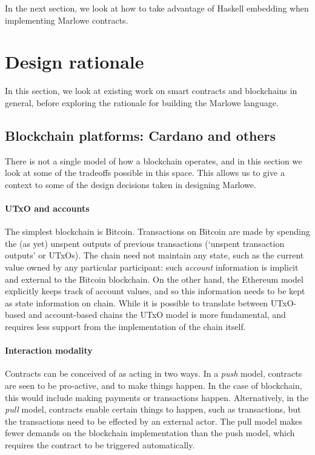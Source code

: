 \documentclass[runningheads]{llncs}
\begin{document}
{In the next section, we look at how to take advantage of Haskell embedding when implementing Marlowe contracts.



\section{Design rationale}
\label{section:design}

\medskip
\noindent
In this section, we look at existing work on smart contracts and blockchains in general, before exploring the rationale 
for building the Marlowe language.




\subsection{Blockchain platforms: Cardano and others}

There is not a single model of how a blockchain operates, and in this section we look at some of the tradeoffs possible 
in this space. This allows us to give a context to some of the design decisions taken in designing Marlowe.  

\paragraph{UTxO and accounts}

The simplest blockchain is Bitcoin. Transactions on Bitcoin are made by spending the (as yet) unspent outputs of 
previous transactions (`unspent transaction outputs' or UTxOs). The chain need not maintain any state, such as the 
current value owned by any particular participant: such \emph{account} information is implicit and external to the 
Bitcoin blockchain. On the other hand, the Ethereum model explicitly keeps track of account values, and so this 
information needs to be kept as state information on chain. While it is possible to translate between UTxO-based and 
account-based chains  the UTxO model is more fundamental, and requires less support from the 
implementation of the chain itself.

\paragraph{Interaction modality}

Contracts can be conceived of as acting in two ways. In a \emph{push} model, contracts are seen to be pro-active, and to 
make things happen. In the case of blockchain, this would include making payments or transactions happen. 
Alternatively, in the \emph{pull} model, contracts enable certain things to happen, such as transactions, but the 
transactions need to be effected by an external actor. The pull model makes fewer demands on the blockchain 
implementation than the push model, which requires the contract to be triggered automatically.

}
\end{document}
